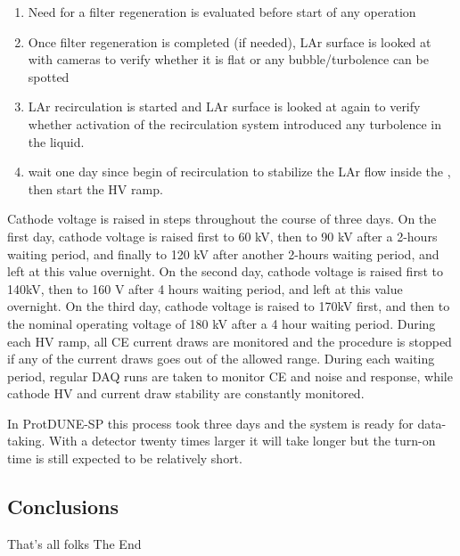 \begin{enumerate}

    \item Need for a filter regeneration is evaluated before start of any operation

    \item Once filter regeneration is completed (if needed), LAr surface is looked at with cameras to verify whether it is flat or any bubble/turbolence can be spotted
    
    \item LAr recirculation is started and LAr surface is looked at again to verify whether activation of the recirculation system introduced any turbolence in the liquid.
    
    \item wait one day since begin of recirculation to stabilize the LAr flow inside the , then start the HV ramp.
    
\end{enumerate}

Cathode voltage is raised in steps throughout the course of three days. 
On the first day, cathode voltage is raised first to 60 kV, then to 90 kV after a 2-hours waiting period, and finally to 120 kV after another 2-hours waiting period, and left at this value overnight.
On the second day, cathode voltage is raised first to 140kV, then to 160 V after 4 hours waiting period, and left at this value overnight.
On the third day, cathode voltage is raised to 170kV first, and then to the nominal operating voltage of 180 kV after a 4 hour waiting period.
During each HV ramp, all CE current draws are monitored and the procedure is stopped if any of the current draws goes out of the allowed range.
During each waiting period, regular DAQ runs are taken to monitor CE and  noise and response, while cathode HV and current draw stability are constantly monitored.

In ProtDUNE-SP this process took three days and the system is ready for data-taking. With a detector twenty times larger it will take longer but the turn-on time is still expected to be relatively short. 

\subsection{Conclusions}
\label{sec:fdsp-tc-inst-concl}

That's all folks
The End
